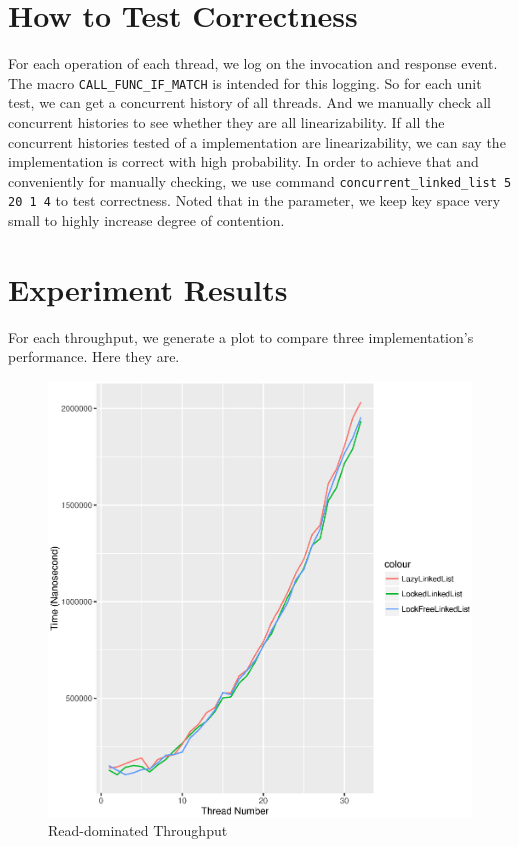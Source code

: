 \documentclass[a4paper]{report}
\begin{document}
\section*{How to Test Correctness}
For each operation of each thread, we log on the invocation and response event. The macro \lstinline{CALL_FUNC_IF_MATCH} is intended for this logging. So for each unit test, we can get a concurrent history of all threads. And we manually check all concurrent histories to see whether they are all linearizability. If all the concurrent histories tested of a implementation are linearizability, we can say the implementation is correct with high probability. In order to achieve that and conveniently for manually checking, we use command \lstinline{concurrent_linked_list 5 20 1 4} to test correctness. Noted that in the parameter, we keep key space very small to highly increase degree of contention.

\section*{Experiment Results}
For each throughput, we generate a plot to compare three implementation's performance. Here they are.
\begin{figure}[H]
  \includegraphics[scale=0.8]{result/result-tacc-7796986-read}
  \caption{Read-dominated Throughput}
\end{figure}
\end{document}
